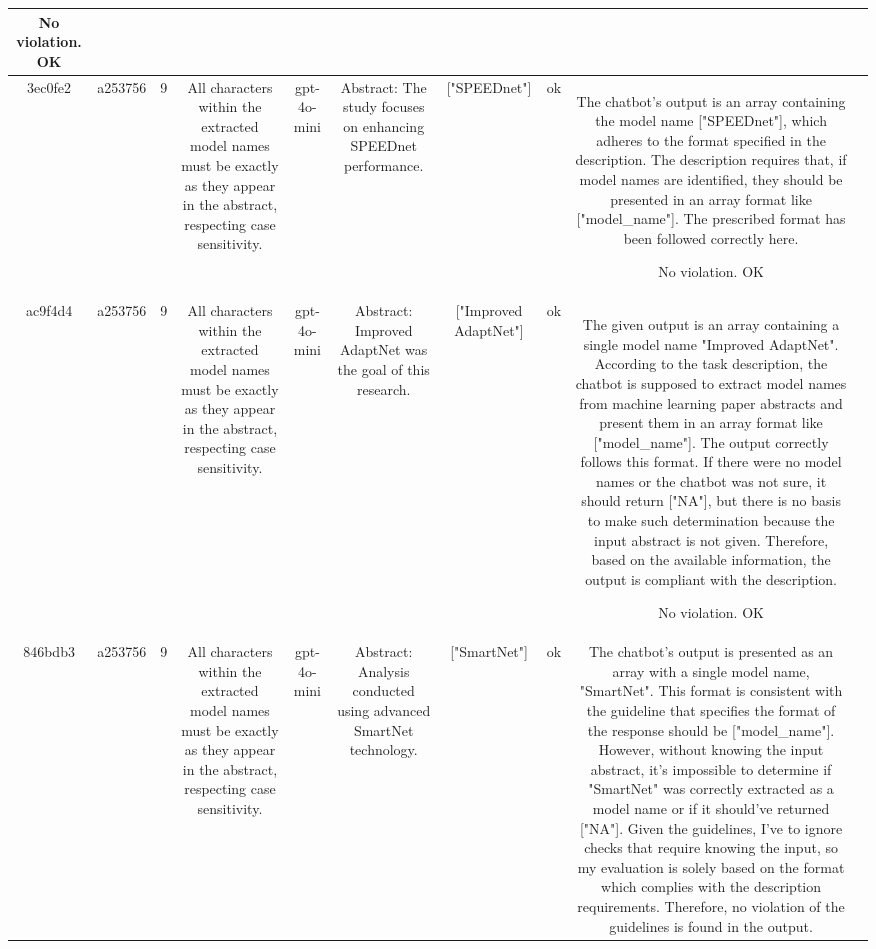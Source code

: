 \begin{table}[h!]
\begin{tabular}{|c|c|c|c|c|c|c|c|c|c|}
No violation.
OK & \\
\hline
3ec0fe2 & a253756 & 9 & All characters within the extracted model names must be exactly as they appear in the abstract, respecting case sensitivity. & gpt-4o-mini & Abstract: The study focuses on enhancing SPEEDnet performance. & ["SPEEDnet"] & ok & The chatbot's output is an array containing the model name ["SPEEDnet"], which adheres to the format specified in the description. The description requires that, if model names are identified, they should be presented in an array format like ["model_name"]. The prescribed format has been followed correctly here.

No violation.
OK & \\
\hline
ac9f4d4 & a253756 & 9 & All characters within the extracted model names must be exactly as they appear in the abstract, respecting case sensitivity. & gpt-4o-mini & Abstract: Improved AdaptNet was the goal of this research. & ["Improved AdaptNet"] & ok & The given output is an array containing a single model name "Improved AdaptNet". According to the task description, the chatbot is supposed to extract model names from machine learning paper abstracts and present them in an array format like ["model_name"]. The output correctly follows this format. If there were no model names or the chatbot was not sure, it should return ["NA"], but there is no basis to make such determination because the input abstract is not given. Therefore, based on the available information, the output is compliant with the description.

No violation.
OK & \\
\hline
846bdb3 & a253756 & 9 & All characters within the extracted model names must be exactly as they appear in the abstract, respecting case sensitivity. & gpt-4o-mini & Abstract: Analysis conducted using advanced SmartNet technology. & ["SmartNet"] & ok & The chatbot's output is presented as an array with a single model name, "SmartNet". This format is consistent with the guideline that specifies the format of the response should be ["model_name"]. However, without knowing the input abstract, it's impossible to determine if "SmartNet" was correctly extracted as a model name or if it should've returned ["NA"]. Given the guidelines, I've to ignore checks that require knowing the input, so my evaluation is solely based on the format which complies with the description requirements. Therefore, no violation of the guidelines is found in the output.


\end{tabular}
\end{table}
